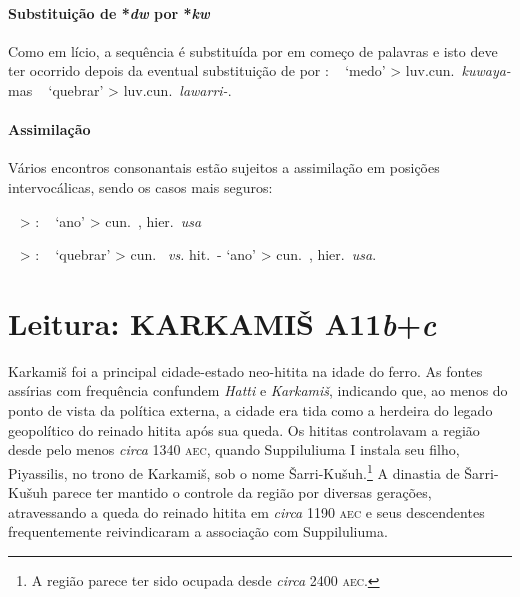 \paragraph{Substituição de *\emph{dw} por *\emph{kw}}
Como em lício, a sequência  é substituída por
 em começo de palavras e isto deve ter ocorrido depois da
eventual substituição de  por :
\pac~ `medo' > luv.cun.\ \emph{kuwaya-} mas
\pac~ `quebrar' > luv.cun.\ \emph{lawarri-}.

\paragraph{Assimilação} Vários encontros consonantais estão sujeitos
a assimilação em posições intervocálicas, sendo os casos mais seguros:
\begin{compactitem}
	\item  \pac~ > : \pac~
	`ano' > cun.\ \emph{}, hier.\ \emph{usa}
	\item  \pac~ > :
	\pac~
	`quebrar' > cun.\ \emph{} \emph{vs.}
	hit.\ \emph{}-
	`ano' > cun.\ \emph{}, hier.\ \emph{usa}.
\end{compactitem}


\section{Leitura: KARKAMIŠ A11\emph{b}+\emph{c}}
Karkamiš foi a principal cidade-estado neo-hitita na idade do ferro.
As fontes assírias com frequência confundem \emph{Hatti} e \emph{Karkamiš},
indicando que, ao menos do ponto de vista da política externa, a cidade era tida
como a herdeira do legado geopolítico do reinado hitita após sua queda.
Os hititas controlavam a região desde pelo menos \emph{circa} 1340 \textsc{aec},
quando Suppiluliuma I instala seu filho, Piyassilis, no trono de Karkamiš, sob o
nome Šarri-Kušuh.\footnote{A região parece ter sido ocupada desde \emph{circa}
	2400 \textsc{aec}.}
A dinastia de Šarri-Kušuh parece ter mantido o controle da região por diversas
gerações, atravessando a queda do reinado hitita em \emph{circa} 1190
\textsc{aec} e seus descendentes frequentemente reivindicaram a associação com
Suppiluliuma.


